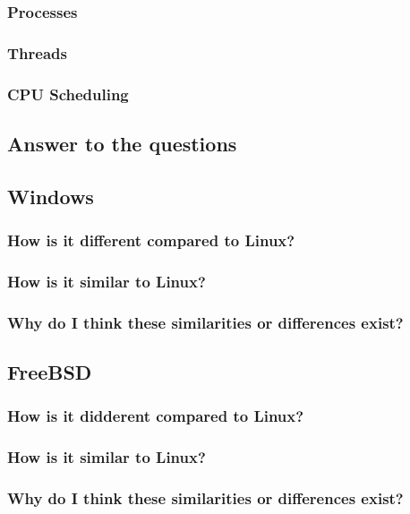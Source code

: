 \documentclass[letterpaper,10pt,draftclsnofoot,onecolumn]{IEEEtran}
\begin{document}
\subsubsection*{Processes}
\subsubsection*{Threads}
\subsubsection*{CPU Scheduling}

\subsection*{Answer to the questions}
\subsection*{Windows}
\subsubsection*{How is it different compared to Linux?}
\subsubsection*{How is it similar to Linux?}
\subsubsection*{Why do I think these similarities or differences exist?}

\subsection*{FreeBSD}
\subsubsection*{How is it didderent compared to Linux?}
\subsubsection*{How is it similar to Linux?}
\subsubsection*{Why do I think these similarities or differences exist?}
\end{document}

